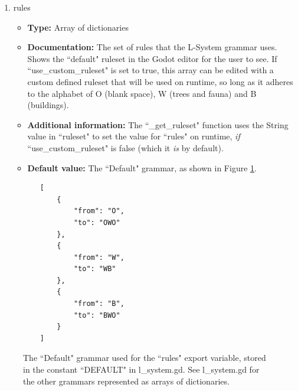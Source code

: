 \begin{enumerate}
\begin{itemize}
        \begin{enumerate}
            \item ``Default"
            \item ``More Buildings (IMPOSSIBLE)"
            \item ``More Trees"
            \item ``More Space"
        \end{enumerate}
        \item \textbf{Documentation:} Denotes a series of pre-defined rulesets for this L-System grammar, of alphabet O (blank space), W (trees and fauna) and B (buildings), that can be chosen and then used on runtime. Can choose between a default ruleset, a ruleset that produces more buildings, a ruleset that produces more trees and a ruleset that produces more empty space.
        \item \textbf{Default value:} ``Default"
    \end{itemize}
    \item rules
    \begin{itemize}
        \item \textbf{Type:} Array of dictionaries
        \item \textbf{Documentation:} The set of rules that the L-System grammar uses. Shows the ``default" ruleset in the Godot editor for the user to see. If ``use\_custom\_ruleset" is set to true, this array can be edited with a custom defined ruleset that will be used on runtime, so long as it adheres to the alphabet of O (blank space), W (trees and fauna) and B (buildings).
        \item \textbf{Additional information:} The ``\_get\_ruleset" function uses the String value in ``ruleset" to set the value for ``rules" on runtime, \textit{if} ``use\_custom\_ruleset" is false (which it \textit{is} by default).
        \item \textbf{Default value:} The ``Default" grammar, as shown in Figure \ref{fig:defaultgrammar}.
    \end{itemize}
\end{enumerate}

\begin{figure}[H]
    \centering
    \begin{lstlisting}
    [
    	{
    		"from": "O",
    		"to": "OWO"
    	},
    	{
    		"from": "W",
    		"to": "WB"
    	},
    	{
    		"from": "B",
    		"to": "BWO"
    	}
    ]
    \end{lstlisting}
    \caption{The ``Default" grammar used for the ``rules" export variable, stored in the constant ``DEFAULT" in l\_system.gd. See l\_system.gd for the other grammars represented as arrays of dictionaries.}
    \label{fig:defaultgrammar}
\end{figure}

